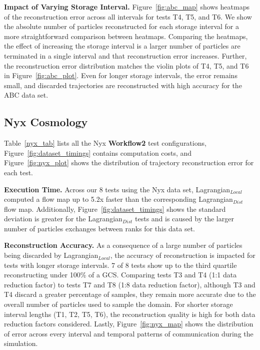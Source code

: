 \textbf{Impact of Varying Storage Interval.} Figure~\ref{fig:abc_map} shows heatmaps of the reconstruction error across all intervals for tests T4, T5, and T6.
%
We show the absolute number of particles reconstructed for each storage interval for a more straightforward comparison between heatmaps.
%
Comparing the heatmaps, the effect of increasing the storage interval is a larger number of particles are terminated in a single interval and that reconstruction error increases. 
%
Further, the reconstruction error distribution matches the violin plots of T4, T5, and T6 in Figure~\ref{fig:abc_plot}. 
%
Even for longer storage intervals, the error remains small, and discarded trajectories are reconstructed with high accuracy for the ABC data set.

\subsection{Nyx Cosmology}
\label{sec:nyx}
Table~\ref{nyx_tab} lists all the Nyx \textbf{Workflow2} test configurations, Figure~\ref{fig:dataset_timings} contains computation costs, and Figure~\ref{fig:nyx_plot} shows the distribution of trajectory reconstruction error for each test.
%


\textbf{Execution Time.} Across our 8 tests using the Nyx data set, Lagrangian$_{Local}$ computed a flow map up to 5.2x faster than the corresponding Lagrangian$_{Dist}$ flow map.
%
Additionally, Figure~\ref{fig:dataset_timings} shows the standard deviation is greater for the Lagrangian$_{Dist}$ tests and is caused by the larger number of particles exchanges between ranks for this data set.
%

\textbf{Reconstruction Accuracy.} As a consequence of a large number of particles being discarded by Lagrangian$_{Local}$, the accuracy of reconstruction is impacted for tests with longer storage intervals.
%
7 of 8 tests show up to the third quartile reconstructing under 100\% of a GCS. 
%
Comparing tests T3 and T4 (1:1 data reduction factor) to tests T7 and T8 (1:8 data reduction factor), although T3 and T4 discard a greater percentage of samples, they remain more accurate due to the overall number of particles used to sample the domain.
%
For shorter storage interval lengths (T1, T2, T5, T6), the reconstruction quality is high for both data reduction factors considered. 
%
Lastly, Figure~\ref{fig:nyx_map} shows the distribution of error across every interval and temporal patterns of communication during the simulation. 

